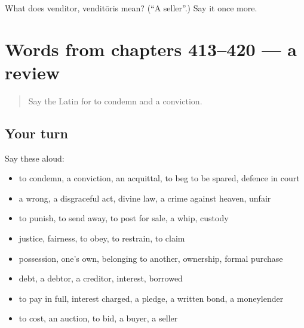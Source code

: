 \begin{tcolorbox}[breakable,colback=teal!4,colframe=teal!35!black,title={Before you move on}]
What does venditor, venditōris mean? (\textquotedblleft{}A seller\textquotedblright{}.) Say it once more.
\end{tcolorbox}
\section[(dialogue)]{Words from chapters 413–420 — a review}

\label{lesson:LA-R420-review-413-420}



\begin{quote}
Say the Latin for to condemn and a conviction.
\end{quote}

\subsection*{Your turn}
Say these aloud:

\begin{itemize}
\raggedright
  \item to condemn, a conviction, an acquittal, to beg to be spared, defence in court
  \item a wrong, a disgraceful act, divine law, a crime against heaven, unfair
  \item to punish, to send away, to post for sale, a whip, custody
  \item justice, fairness, to obey, to restrain, to claim
  \item possession, one's own, belonging to another, ownership, formal purchase
  \item debt, a debtor, a creditor, interest, borrowed
  \item to pay in full, interest charged, a pledge, a written bond, a moneylender
  \item to cost, an auction, to bid, a buyer, a seller
\end{itemize}

